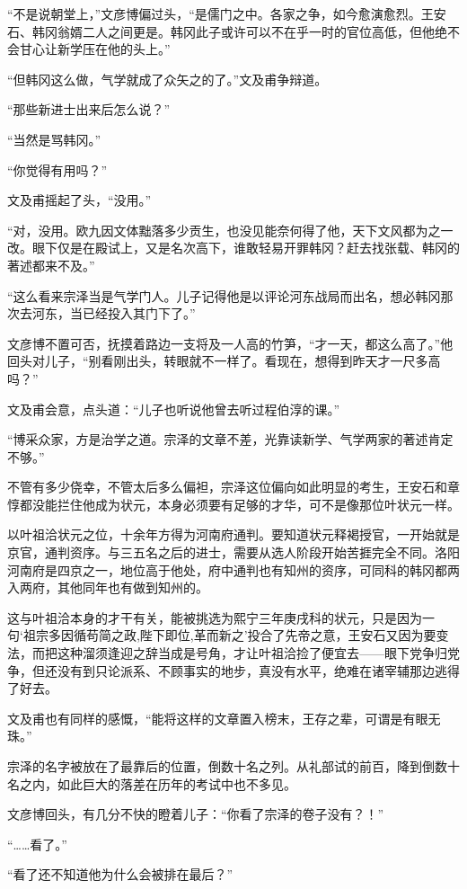 “不是说朝堂上，”文彦博偏过头，“是儒门之中。各家之争，如今愈演愈烈。王安石、韩冈翁婿二人之间更是。韩冈此子或许可以不在乎一时的官位高低，但他绝不会甘心让新学压在他的头上。”

“但韩冈这么做，气学就成了众矢之的了。”文及甫争辩道。

“那些新进士出来后怎么说？”

“当然是骂韩冈。”

“你觉得有用吗？”

文及甫摇起了头，“没用。”

“对，没用。欧九因文体黜落多少贡生，也没见能奈何得了他，天下文风都为之一改。眼下仅是在殿试上，又是名次高下，谁敢轻易开罪韩冈？赶去找张载、韩冈的著述都来不及。”

“这么看来宗泽当是气学门人。儿子记得他是以评论河东战局而出名，想必韩冈那次去河东，当已经投入其门下了。”

文彦博不置可否，抚摸着路边一支将及一人高的竹笋，“才一天，都这么高了。”他回头对儿子，“别看刚出头，转眼就不一样了。看现在，想得到昨天才一尺多高吗？”

文及甫会意，点头道：“儿子也听说他曾去听过程伯淳的课。”

“博采众家，方是治学之道。宗泽的文章不差，光靠读新学、气学两家的著述肯定不够。”

不管有多少侥幸，不管太后多么偏袒，宗泽这位偏向如此明显的考生，王安石和章惇都没能拦住他成为状元，本身必须要有足够的才华，可不是像那位叶状元一样。

以叶祖洽状元之位，十余年方得为河南府通判。要知道状元释褐授官，一开始就是京官，通判资序。与三五名之后的进士，需要从选人阶段开始苦捱完全不同。洛阳河南府是四京之一，地位高于他处，府中通判也有知州的资序，可同科的韩冈都两入两府，其他同年也有做到知州的。

这与叶祖洽本身的才干有关，能被挑选为熙宁三年庚戌科的状元，只是因为一句‘祖宗多因循苟简之政,陛下即位,革而新之’投合了先帝之意，王安石又因为要变法，而把这种溜须逢迎之辞当成是号角，才让叶祖洽捡了便宜去——眼下党争归党争，但还没有到只论派系、不顾事实的地步，真没有水平，绝难在诸宰辅那边逃得了好去。

文及甫也有同样的感慨，“能将这样的文章置入榜末，王存之辈，可谓是有眼无珠。”

宗泽的名字被放在了最靠后的位置，倒数十名之列。从礼部试的前百，降到倒数十名之内，如此巨大的落差在历年的考试中也不多见。

文彦博回头，有几分不快的瞪着儿子：“你看了宗泽的卷子没有？！”

“……看了。”

“看了还不知道他为什么会被排在最后？”

